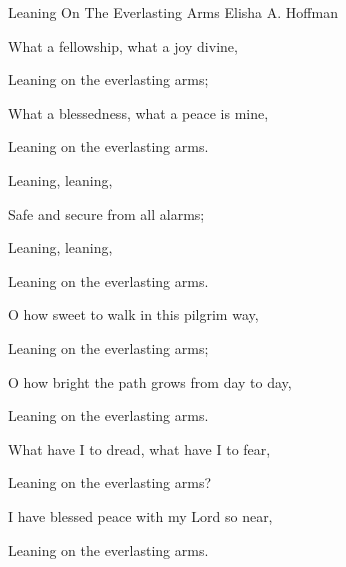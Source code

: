 \documentclass[12pt]{book}
\newcommand{\WBColBrk}{%
  \ifWordBk%
  \newpage%
\fi}
\begin{document}
\begin{song}{Leaning On The Everlasting Arms}{}
  {\SBPubDom}
  {Elisha A. Hoffman}
  {}
  {}

  \begin{SBVerse}
    What a fellowship, what a joy divine,

    Leaning on the everlasting arms;

    What a blessedness, what a peace is mine,

    Leaning on the everlasting arms.
  \end{SBVerse}

  \begin{SBOpGroup}
    Leaning, leaning,

    Safe and secure from all alarms;

    Leaning, leaning,

    Leaning on the everlasting arms.
  \end{SBOpGroup}

  \begin{SBVerse}
    O how sweet to walk in this pilgrim way,

    Leaning on the everlasting arms;

    O how bright the path grows from day to day,

    Leaning on the everlasting arms.
  \end{SBVerse}

  \begin{SBVerse}
    What have I to dread, what have I to fear,

    Leaning on the everlasting arms?

    I have blessed peace with my Lord so near,

    Leaning on the everlasting arms.
  \end{SBVerse}
\end{song}

\WBColBrk
\end{document}
